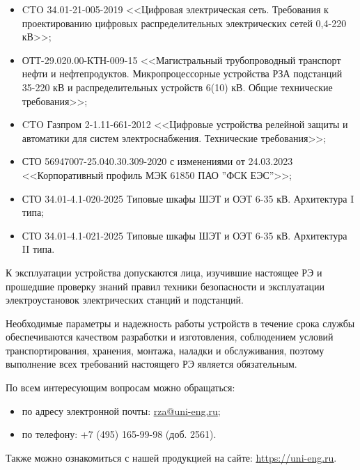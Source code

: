 \begin{itemize}
    \item CTO 34.01-21-005-2019 <<Цифровая электрическая сеть. Требования к проектированию цифровых распределительных электрических сетей 0,4-220 кВ>>;
    \item \sloppy ОТТ-29.020.00-КТН-009-15 <<Магистральный трубопроводный транспорт нефти и нефтепродуктов. Микропроцессорные устройства РЗА подстанций 35-220 кВ и распределительных устройств 6(10) кВ. Общие технические требования>>;
    \item CTO Газпром 2-1.11-661-2012 <<Цифровые устройства релейной защиты и автоматики для систем электроснабжения. Технические требования>>;
    \item СТО 56947007-25.040.30.309-2020 с изменениями от 24.03.2023 <<Корпоративный профиль МЭК 61850 ПАО ''ФСК ЕЭС''>>;
    \item СТО 34.01-4.1-020-2025 Типовые шкафы ШЭТ и ОЭТ 6-35 кВ. Архитектура I типа;
    \item СТО 34.01-4.1-021-2025 Типовые шкафы ШЭТ и ОЭТ 6-35 кВ. Архитектура II типа.
\end{itemize}

\par
К эксплуатации устройства допускаются лица, изучившие настоящее РЭ и прошедшие проверку знаний правил техники безопасности и эксплуатации электроустановок электрических станций и подстанций.

\par
Необходимые параметры и надежность работы устройств в течение срока службы обеспечиваются качеством разработки и изготовления, соблюдением условий транспортирования, хранения, монтажа, наладки и обслуживания, поэтому выполнение всех требований настоящего РЭ является обязательным.
\par
По всем интересующим вопросам можно обращаться:
\begin{itemize}
\item по адресу электронной почты: \href{mailto:rza@uni-eng.ru}{\color{uniblue}\uline{rza@uni-eng.ru}};
\item по телефону: +7 (495) 165-99-98 (доб. 2561).
\end{itemize}
Также можно ознакомиться с нашей продукцией на сайте: \href{https://uni-eng.ru}{\color{uniblue}\uline{https://uni-eng.ru}}.









